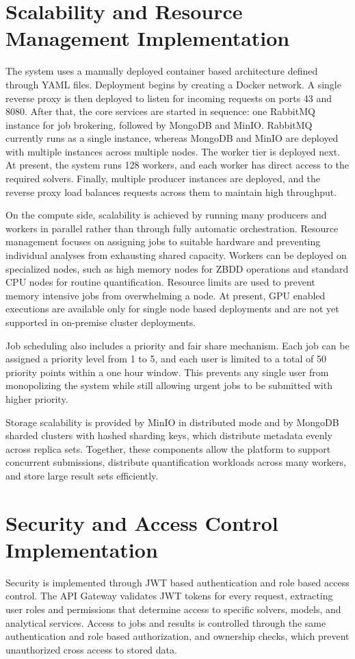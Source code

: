 \section{Scalability and Resource Management Implementation}
The system uses a manually deployed container based architecture defined through YAML files. Deployment begins by creating a Docker network. A single reverse proxy is then deployed to listen for incoming requests on ports 43 and 8080. After that, the core services are started in sequence: one RabbitMQ instance for job brokering, followed by MongoDB and MinIO. RabbitMQ currently runs as a single instance, whereas MongoDB and MinIO are deployed with multiple instances across multiple nodes. The worker tier is deployed next. At present, the system runs 128 workers, and each worker has direct access to the required solvers. Finally, multiple producer instances are deployed, and the reverse proxy load balances requests across them to maintain high throughput.

On the compute side, scalability is achieved by running many producers and workers in parallel rather than through fully automatic orchestration. Resource management focuses on assigning jobs to suitable hardware and preventing individual analyses from exhausting shared capacity. Workers can be deployed on specialized nodes, such as high memory nodes for ZBDD operations and standard CPU nodes for routine quantification. Resource limits are used to prevent memory intensive jobs from overwhelming a node. At present, GPU enabled executions are available only for single node based deployments and are not yet supported in on-premise cluster deployments.

Job scheduling also includes a priority and fair share mechanism. Each job can be assigned a priority level from 1 to 5, and each user is limited to a total of 50 priority points within a one hour window. This prevents any single user from monopolizing the system while still allowing urgent jobs to be submitted with higher priority.

Storage scalability is provided by MinIO in distributed mode and by MongoDB sharded clusters with hashed sharding keys, which distribute metadata evenly across replica sets. Together, these components allow the platform to support concurrent submissions, distribute quantification workloads across many workers, and store large result sets efficiently.

\section{Security and Access Control Implementation}
Security is implemented through JWT based authentication and role based access control. The API Gateway validates JWT tokens for every request, extracting user roles and permissions that determine access to specific solvers, models, and analytical services. Access to jobs and results is controlled through the same authentication and role based authorization, and ownership checks, which prevent unauthorized cross access to stored data.

